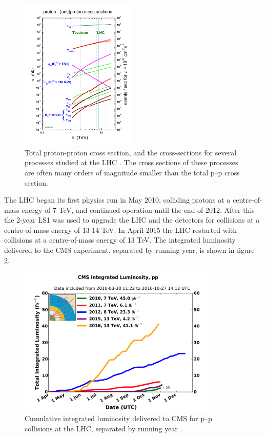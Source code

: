 \begin{figure}[h!]
\includegraphics[width=0.5\textwidth]{./Detector/Plots/crosssections2013.jpg}
\caption{Total proton-proton cross section, and the cross-sections
for several processes studied at the LHC \cite{stirling-crosssection}.
The cross sections of these processes
are often many orders of magnitude smaller than the total p--p cross section.}
\label{fig:stirling_xs}
\end{figure}


The \ac{LHC} began its first physics run in May 2010, colliding protons at
a centre-of-mass energy of 7 TeV, and continued operation until the end of 2012. After this the 
2-year \ac{LS1} was used to upgrade the \ac{LHC} and the detectors for collisions at a centre-of-mass
energy of 13-14 TeV. In April 2015 the \ac{LHC} restarted with collisions at a centre-of-mass energy of
13 TeV. The integrated luminosity delivered to the \ac{CMS} experiment, separated by running year, is shown in
figure \ref{fig:CMSLHC_intlumi}.

\begin{figure}[h!]
\includegraphics[width=0.85\textwidth]{./Detector/Plots/int_lumi_cumulative_pp_2.pdf}
\caption{Cumulative integrated luminosity delivered to \ac{CMS} for p--p collisions at the \ac{LHC}, separated
by running year \cite{cms-lumi-public}.}
\label{fig:CMSLHC_intlumi}
\end{figure}

